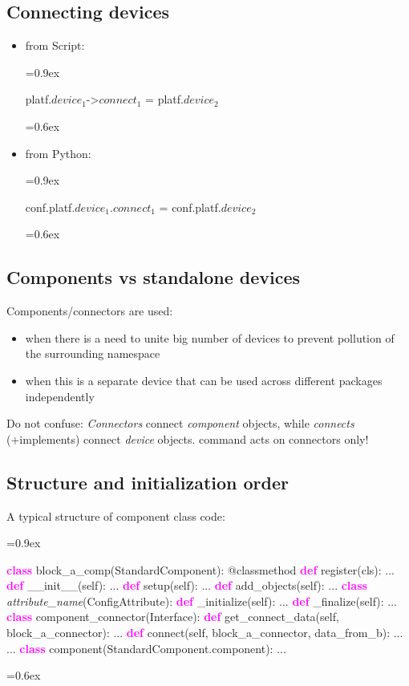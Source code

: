 \documentclass[8pt]{extarticle}
\newcommand{\vshort}[1]{%
\vspace{-0.6em}%
#1%
\vspace{0.0em}}
\newcommand{\vshort}[1]{%
#1%
}
\newcommand{\mywarning}{{\huge \warning}}
\newenvironment{code}[1][]{%
\begin{prebox}[#1]\obeylines%
\fontdimen2\font=0.9ex%
}{%
\end{prebox}%
\fontdimen2\font=0.6ex%
}
\newcommand{\cod}[2][green!10]{\tcbox[
    size=fbox,
    on line,
    colback=#1,
    colframe=black,
    arc=0.3em  %
]{#2}}
\newcommand{\ind}{\hphantom{~~~}}
\newcommand{\kw}[1]{\textcolor{magenta}{\textbf{#1}}}
\newcommand{\p}[1]{\textit{\large#1}}
\newcommand{\class}{\kw{class} }
\begin{document}
\begin{multicols*}{3}
\subsection{Connecting devices}
  \begin{itemize}
      \item from Script:
          \begin{code}
              platf.$device_1$->$connect_1$ = platf.$device_2$
          \end{code}
      \item from Python:
          \begin{code}
              conf.platf.$device_1$.$connect_1$ = conf.platf.$device_2$
          \end{code}
  \end{itemize}

\subsection{Components vs standalone devices}

Components/connectors are used:
\begin{itemize}
    \item when there is a need to unite big number of devices
        to prevent pollution of the surrounding namespace
    \item when this is a separate device that can be used across
        different packages independently
\end{itemize}

\mywarning Do not confuse: \textit{Connectors} connect \textit{component}
objects, while \textit{connects} (+implements) connect \textit{device}
objects. \cod{connect} command acts on connectors only!

\subsection{Structure and initialization order}

A typical structure of component class code:
\begin{code}
    \class block_a_comp(StandardComponent):
        \ind @classmethod
        \ind \kw{def} register(cls):
            \vshort{\ind\ind ...}
        \ind \kw{def} __init__(self):
            \vshort{\ind\ind ...}
        \ind \kw{def} setup(self):
            \vshort{\ind\ind ...}
        \ind \kw{def} add_objects(self):
            \vshort{\ind\ind ...}
        \ind \class \p{attribute_name}(ConfigAttribute):
            \ind \ind \kw{def} _initialize(self):
                \vshort{\ind\ind\ind ...}
            \ind \ind \kw{def} _finalize(self):
                \vshort{\ind\ind\ind ...}
        \ind \class component_connector(Interface):
            \ind \ind \kw{def} get_connect_data(self, block_a_connector):
                \vshort{\ind \ind \ind...}
            \ind \ind \kw{def} connect(self, block_a_connector, data_from_b):
                \vshort{\ind \ind \ind...}
        \vshort{\ind ...}
        \ind \class component(StandardComponent.component):
        \vshort{\ind ...}
\end{code}


\end{multicols*}
\end{document}
